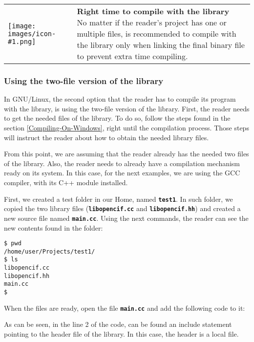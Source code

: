 \documentclass[11pt,twoside,openany,x11names,svgnames]{memoir}
\makeatletter
\newcommand{\IconNote}[3]
{
	\begin{table}[ht]
	\begin{tabular}{ lm{\dimexpr\textwidth-8\tabcolsep-\wd0}@{}}
		\toprule
		\texttt{[image: images/icon-\#1.png]}
		&
		\parbox[t]{155mm}{
		\textbf{#2} \\
		#3
		}
	\end{tabular}
\end{table}
}
\makeatother
\begin{document}
\IconNote
	{info}
	{Right time to compile with the library}
	{No matter if the reader's project has one or multiple files, is recommended to compile with the library only when linking the final binary file to prevent extra time compiling.}
	
\subsubsection{Using the two-file version of the library}\label{Using-the-two-file-version-of-the-library}

In GNU/Linux, the second option that the reader has to compile its program with the library, is using the two-file version of the library. First, the reader needs to get the needed files of the library. To do so, follow the steps found in the section \ref{Compiling-On-Windows}, right until the compilation process. Those steps will instruct the reader about how to obtain the needed library files.

From this point, we are assuming that the reader already has the needed two files of the library. Also, the reader needs to already have a compilation mechanism ready on its system. In this case, for the next examples, we are using the GCC compiler, with its C++ module installed.

First, we created a test folder in our Home, named \textbf{\texttt{test1}}. In such folder, we copied the two library files (\textbf{\texttt{libopencif.cc}} and \textbf{\texttt{libopencif.hh}}) and created a new source file named \textbf{\texttt{main.cc}}. Using the next commands, the reader can see the new contents found in the folder:

\begin{lstlisting}[frame=single,style=SystemCommandStyle]
$ pwd
/home/user/Projects/test1/
$ ls
libopencif.cc
libopencif.hh
main.cc
$
\end{lstlisting}

When the files are ready, open the file \textbf{\texttt{main.cc}} and add the following code to it:



As can be seen, in the line 2 of the code, can be found an include statement pointing to the  header file of the library. In this case, the header is a local file.
\end{document}
